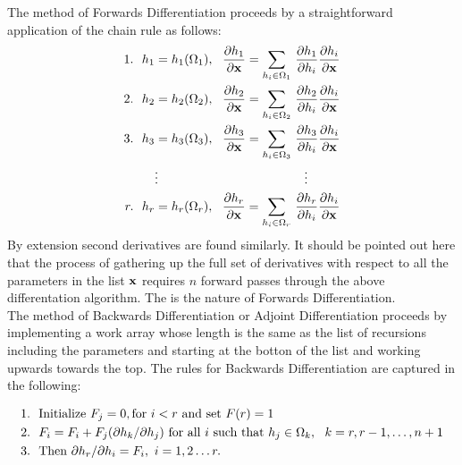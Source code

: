 The method of Forwards Differentiation proceeds by a straightforward application of the chain rule as follows: 
\begin{align*}
1.~~ h_1 &= h_1(\Omega_1), ~~ {\partial h_1\over \partial {\bf x}} = \sum_{h_i\in \Omega_1}\, {\partial h_1\over\partial h_i} {\partial h_i\over\partial {\bf x}}\\
2.~~ h_2 &= h_2(\Omega_2), ~~ {\partial h_2\over \partial {\bf x}} = \sum_{h_i\in \Omega_2}\, {\partial h_2\over\partial h_i} {\partial h_i\over\partial {\bf x}}\\
3.~~ h_3 &= h_3(\Omega_3), ~~ {\partial h_3\over \partial {\bf x}} = \sum_{h_i\in \Omega_3}\, {\partial h_3\over\partial h_i} {\partial h_i\over\partial {\bf x}}\\
               &\vdots~~~~~~~~~~~~~~~~~~~~~~~~~~~~~~~~~~~\vdots\\
r.~~ h_r  &= h_r(\Omega_r),   ~~ {\partial h_r\over \partial {\bf x}} = \sum_{h_i\in \Omega_r}\, {\partial h_r\over\partial h_i} {\partial h_i\over\partial {\bf x}}\\
\end{align*}By extension second derivatives are found similarly. It should be pointed out here that the process of gathering up the full set of derivatives with respect to all the parameters in the list
$\bf x$ requires $n$ forward passes through the above differentation algorithm. The is the nature of Forwards Differentiation.\\


The method of Backwards Differentiation or Adjoint Differentiation proceeds by implementing a work array whose length is the same as the list of recursions including the parameters and starting at the botton of the list and working upwards towards the top. The rules for Backwards Differentiation are captured in the following:

\begin{align*}
1. ~~ & \hbox{Initialize}\ F_j = 0, \hbox{for}\ i<r \hbox{ and set } F(r) = 1\\
2. ~~& F_i = F_i + F_j (\partial h_k/\partial h_j) \hbox{ for all } i \hbox{ such that } h_j \in \Omega_k, ~~ k = r, r-1, \hdots, n+1\\
3. ~~&\hbox{Then } \partial h_r/\partial h_i = F_i, ~i = 1,2\hdots r.\\
\end{align*}

